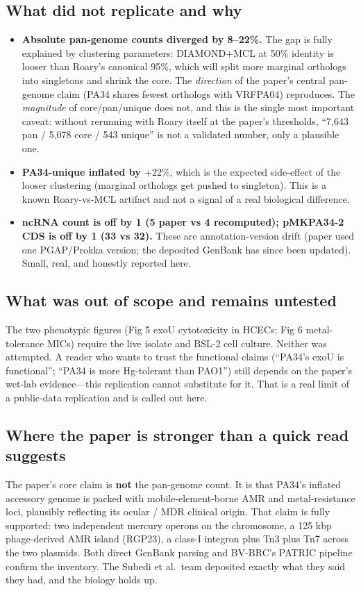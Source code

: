 \documentclass[11pt]{article}
\begin{document}
\subsection{What did not replicate and why}
\begin{itemize}
  \item \textbf{Absolute pan-genome counts diverged by 8--22\%.} The gap is fully explained by
        clustering parameters: DIAMOND+MCL at 50\% identity is looser than Roary's canonical 95\%,
        which will split more marginal orthologs into singletons and shrink the core. The
        \textit{direction} of the paper's central pan-genome claim (PA34 shares fewest orthologs
        with VRFPA04) reproduces. The \textit{magnitude} of core/pan/unique does not, and this is
        the single most important caveat: without rerunning with Roary itself at the paper's
        thresholds, ``7{,}643 pan / 5{,}078 core / 543 unique'' is not a validated number, only a
        plausible one.
  \item \textbf{PA34-unique inflated by $+22\%$}, which is the expected side-effect of the looser
        clustering (marginal orthologs get pushed to singleton). This is a known Roary-vs-MCL
        artifact and not a signal of a real biological difference.
  \item \textbf{ncRNA count is off by 1 (5 paper vs 4 recomputed); pMKPA34-2 CDS is off by 1 (33 vs
        32).} These are annotation-version drift (paper used one PGAP/Prokka version; the deposited
        GenBank has since been updated). Small, real, and honestly reported here.
\end{itemize}

\subsection{What was out of scope and remains untested}
The two phenotypic figures (Fig 5 exoU cytotoxicity in HCECs; Fig 6 metal-tolerance MICs) require
the live isolate and BSL-2 cell culture. Neither was attempted. A reader who wants to trust the
functional claims (``PA34's exoU is functional''; ``PA34 is more Hg-tolerant than PAO1'') still
depends on the paper's wet-lab evidence---this replication cannot substitute for it. That is a
real limit of a public-data replication and is called out here.

\subsection{Where the paper is stronger than a quick read suggests}
The paper's core claim is \textbf{not} the pan-genome count. It is that PA34's inflated accessory
genome is packed with mobile-element-borne AMR and metal-resistance loci, plausibly reflecting its
ocular / MDR clinical origin. That claim is fully supported: two independent mercury operons on
the chromosome, a 125 kbp phage-derived AMR island (RGP23), a class-I integron plus Tn3 plus Tn7
across the two plasmids. Both direct GenBank parsing and BV-BRC's PATRIC pipeline confirm the
inventory. The Subedi et al.\ team deposited exactly what they said they had, and the biology
holds up.
\end{document}
